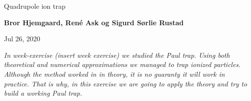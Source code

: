 \documentclass[%
oneside,                 %
final,                   %
10pt]{article}
\begin{document}

\newcommand{\exercisesection}[1]{\subsection*{#1}}






\thispagestyle{empty}

\begin{center}
{\LARGE\bf
\begin{spacing}{1.25}
Quadrupole ion trap
\end{spacing}
}
\end{center}


\begin{center}
{\bf Bror Hjemgaard, René Ask og Sigurd Sørlie Rustad${}^{}$} \\ [0mm]
\end{center}

\begin{center}
\end{center}
    

\begin{center}
Jul 26, 2020
\end{center}

\vspace{1cm}


\emph{In week-exercise (insert week exercise) we studied the Paul trap. Using both theoretical and numerical approximations we managed to trap ionized particles. Although the method worked in in theory, it is no guaranty it will work in practice. That is why, in this exercise we are going to apply the theory and try to build a working Paul trap.}
\end{document}

